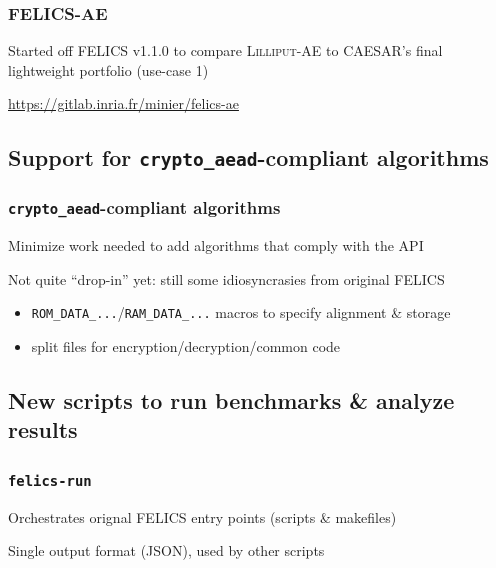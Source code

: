 \documentclass[english]{beamer}
\begin{document}
\begin{frame}
  \frametitle{FELICS-AE}

  Started off FELICS v1.1.0 to compare \textsc{Lilliput-AE} to CAESAR's final lightweight portfolio (use-case 1)

  {\url{https://gitlab.inria.fr/minier/felics-ae}}
\end{frame}

\subsection{Support for \texttt{crypto\_aead}-compliant algorithms}

\begin{frame}
  \frametitle{\texttt{crypto\_aead}-compliant algorithms}

  Minimize work needed to add algorithms that comply with the API


  Not quite ``drop-in'' yet: still some idiosyncrasies from original FELICS

  \begin{itemize}
  \item \texttt{ROM\_DATA\_...}/\texttt{RAM\_DATA\_...} macros to specify alignment \& storage
  \item split files for encryption/decryption/common code
  \end{itemize}

\end{frame}

\subsection{New scripts to run benchmarks \& analyze results}

\begin{frame}
  \frametitle{\texttt{felics-run}}

  Orchestrates orignal FELICS entry points (scripts \& makefiles)

  Single output format (JSON), used by other scripts

\end{frame}
\end{document}
